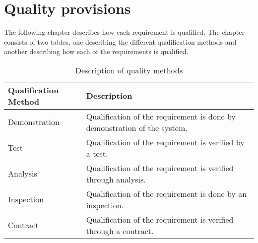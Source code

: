 \chapter{Quality provisions}
The following chapter describes how each requirement is qualified. The chapter consists of two tables, one describing the different qualification methods and another describing how each of the requirements is qualified.\\



\begin{table}[H]
\begin{tabular}{|l|p{9cm}|}
\hline
 \textbf{Qualification Method} & \textbf{Description} \\ \hline
 Demonstration & Qualification of the requirement is done by demonstration of the system. \\  \hline
 Test & Qualification of the requirement is verified by a test. \\  \hline
 Analysis & Qualification of the requirement is verified through analysis.  \\  \hline %
 Inspection & Qualification of the requirement is done by an inspection.  \\  \hline %
 Contract & Qualification of the requirement is verified through a contract. \\ \hline
\end{tabular}
\caption{Description of quality methods}
\end{table}


\enspace


